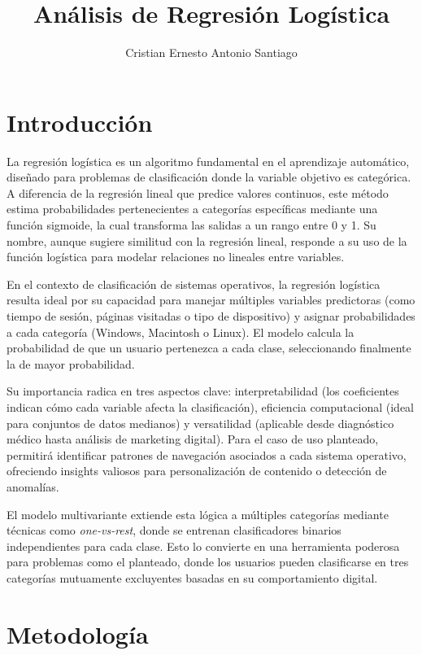 \documentclass{article}
\title{Análisis de Regresión Logística}
\author{Cristian Ernesto Antonio Santiago}
\date{}
\begin{document}
\maketitle

\section{Introducción}

La regresión logística es un algoritmo fundamental en el aprendizaje automático, diseñado para problemas de clasificación donde la variable objetivo es categórica. A diferencia de la regresión lineal que predice valores continuos, este método estima probabilidades pertenecientes a categorías específicas mediante una función sigmoide, la cual transforma las salidas a un rango entre 0 y 1. Su nombre, aunque sugiere similitud con la regresión lineal, responde a su uso de la función logística para modelar relaciones no lineales entre variables.

En el contexto de clasificación de sistemas operativos, la regresión logística resulta ideal por su capacidad para manejar múltiples variables predictoras (como tiempo de sesión, páginas visitadas o tipo de dispositivo) y asignar probabilidades a cada categoría (Windows, Macintosh o Linux). El modelo calcula la probabilidad de que un usuario pertenezca a cada clase, seleccionando finalmente la de mayor probabilidad.

Su importancia radica en tres aspectos clave: interpretabilidad (los coeficientes indican cómo cada variable afecta la clasificación), eficiencia computacional (ideal para conjuntos de datos medianos) y versatilidad (aplicable desde diagnóstico médico hasta análisis de marketing digital). Para el caso de uso planteado, permitirá identificar patrones de navegación asociados a cada sistema operativo, ofreciendo insights valiosos para personalización de contenido o detección de anomalías.

El modelo multivariante extiende esta lógica a múltiples categorías mediante técnicas como \textit{one-vs-rest}, donde se entrenan clasificadores binarios independientes para cada clase. Esto lo convierte en una herramienta poderosa para problemas como el planteado, donde los usuarios pueden clasificarse en tres categorías mutuamente excluyentes basadas en su comportamiento digital.

\newpage

\section{Metodología}
\end{document}
